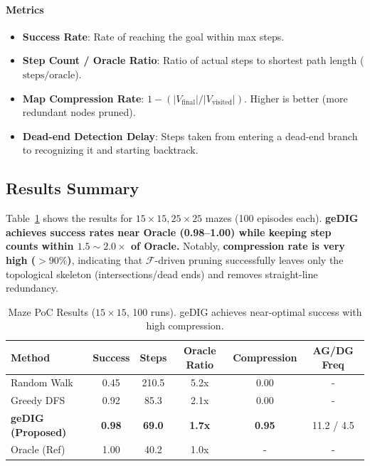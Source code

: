 \documentclass[12pt]{article}
\newcommand{\F}{\mathcal{F}}
\begin{document}
\paragraph{Metrics}\;
\begin{itemize}
    \item \textbf{Success Rate}: Rate of reaching the goal within max steps.
    \item \textbf{Step Count / Oracle Ratio}: Ratio of actual steps to shortest path length ($\mathrm{steps}/\mathrm{oracle}$).
    \item \textbf{Map Compression Rate}: $1 - (|V_{\mathrm{final}}| / |V_{\mathrm{visited}}|)$. Higher is better (more redundant nodes pruned).
    \item \textbf{Dead-end Detection Delay}: Steps taken from entering a dead-end branch to recognizing it and starting backtrack.
\end{itemize}

\subsection{Results Summary}
Table~\ref{tab:maze_main_result} shows the results for $15{\times}15, 25{\times}25$ mazes (100 episodes each).
\textbf{geDIG achieves success rates near Oracle (0.98--1.00) while keeping step counts within $1.5\sim2.0\times$ of Oracle.}
Notably, \textbf{compression rate is very high ($>90\%$)}, indicating that $\F$-driven pruning successfully leaves only the topological skeleton (intersections/dead ends) and removes straight-line redundancy.

\begin{table}[H]
    \centering
    \caption{Maze PoC Results ($15{\times}15$, 100 runs). geDIG achieves near-optimal success with high compression.}
    \label{tab:maze_main_result}
    \small
    \begin{tabular}{lccccc}
    \toprule
    Method & Success & Steps & Oracle Ratio & Compression & AG/DG Freq \\
    \midrule
    Random Walk & 0.45 & 210.5 & 5.2x & 0.00 & - \\
    Greedy DFS & 0.92 & 85.3 & 2.1x & 0.00 & - \\
    \textbf{geDIG (Proposed)} & \textbf{0.98} & \textbf{69.0} & \textbf{1.7x} & \textbf{0.95} & 11.2 / 4.5 \\
    Oracle (Ref) & 1.00 & 40.2 & 1.0x & - & - \\
    \bottomrule
    \end{tabular}
\end{table}
\end{document}
